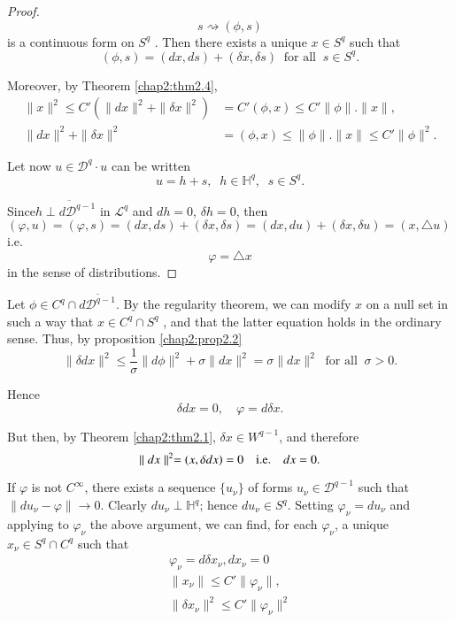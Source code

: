 \begin{proof}
  $$ 
  s  \rightsquigarrow (\phi,s) 
  $$
  is a continuous form on  $S^q$ . Then there exists a unique $x \in S^q $ 
  such that 
  $$ 
  (\phi,s)=(dx,ds)+(\delta x, \delta s) ~ \text{ for all } ~s \in S^q  .
  $$ 

  Moreover, by Theorem \ref{chap2:thm2.4}, 
  \begin{align*} 
    \parallel x \parallel^2 \leq C' ( \parallel dx \parallel^2 +
    \parallel \delta x \parallel^2) & = C' (\phi, x ) \leq C' \parallel
    \phi \parallel.\parallel x \parallel,\\
    \parallel dx \parallel^2 + \parallel \delta x \parallel^2 & =
    (\phi,x) \leq \parallel \phi \parallel.\parallel x \parallel \leq C'
    \parallel \phi \parallel^2.  
  \end{align*}

  Let now  $u \in \mathcal{D}^q  \cdot u$ can be written 
$$
u=h+s, \;\; h \in \mathbb{H}^q ,  \;\; s \in S^q.
$$ 

  Since\pageoriginale $h \overline {\perp d \mathcal{D}^{q-1}} $ in $
  \mathcal{L}^q $  and $dh=0$,  $\delta h=0$, then $(\varphi,u) =
  (\varphi,s)=(dx,ds)+(\delta x, \delta s) = (d x, d u) + (\delta x,
  \delta u) = (x, \triangle u)$ i.e.
  $$ 
  \varphi = \triangle x
  $$
  in the sense of distributions. 
\end{proof}

Let $ \phi \in C^q \cap \overline{d \mathcal{D}^{q-1}}$. By the
regularity theorem, we can modify $x$ on a null set in such a way that $x
\in C^q \cap S^q $ , and that the latter equation holds in the
ordinary sense. Thus, by proposition \ref{chap2:prop2.2}
$$ 
\parallel \delta d x \parallel^2 \leq \frac{1}{\sigma}\parallel d
\phi \parallel^2+\sigma \parallel dx \parallel^2 = \sigma \parallel dx
\parallel^2 ~\text{ for all } ~ \sigma > 0.
$$ 

Hence 
$$ 
\delta d x=0, \quad \varphi=d \delta x .
$$  

But then, by Theorem \ref{chap2:thm2.1}, $ \delta x \in W^{q-1}$, and
therefore  
$$ 
\parallel dx \parallel^2 = (x,\delta dx)=0\quad {\rm i.e.}\quad  dx=0. 
$$

If $\varphi$ is not $ C^\infty $, there exists a sequence $ \{u_\nu \}$
of forms  $u_\nu \in \mathcal{D}^{q-1}$ such that $ \parallel  
du_\nu - \varphi \parallel \longrightarrow 0$. Clearly $ du_\nu
\perp \mathbb{H}^q $; hence $ du_\nu \in S^q$. Setting $ \varphi_\nu  
= du_\nu $ and applying to $ \varphi_\nu $ the above argument, we can
find, for each $\varphi_\nu$, a unique $ x_\nu \in S^q \cap C^q$ such that 
\begin{gather*}
  \varphi_\nu = d \delta x_\nu, dx_\nu =0 \\
  \parallel x_\nu\parallel \leq C'\parallel \varphi_\nu\parallel ,\\
  \parallel \delta x_\nu\parallel^2 \leq C' \parallel \varphi_\nu
  \parallel^2
\end{gather*}

